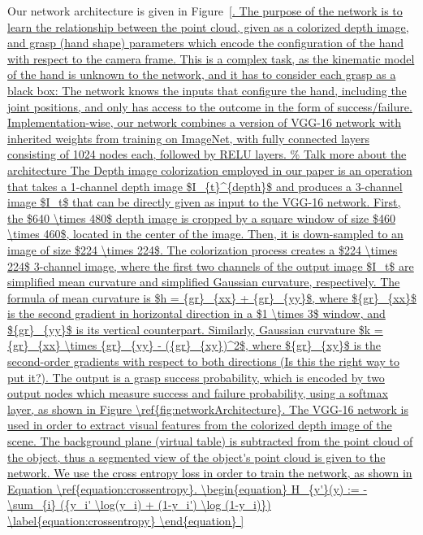 Our network architecture is given in Figure~\ref{. The purpose of the network is to learn the relationship between the point cloud, given as a colorized depth image, and grasp (hand shape) parameters which encode the configuration of the hand with respect to the camera frame. This is a complex task, as the kinematic model of the hand is unknown to the network, and it has to consider each grasp as a black box: The network knows the inputs that configure the hand, including the joint positions, and only has access to the outcome in the form of success/failure. Implementation-wise, our network combines a version of VGG-16 network with inherited weights from training on ImageNet, with fully connected layers consisting of 1024 nodes each, followed by RELU layers. 

The Depth image colorization employed in our paper is an operation that takes a 1-channel depth image $I_{t}^{depth}$ and produces a 3-channel image $I_t$ that can be directly given as input to the VGG-16 network. First, the $640 \times 480$ depth image is cropped by a square window of size $460 \times 460$, located in the center of the image. Then, it is down-sampled to an image of size $224 \times 224$. The colorization process creates a $224 \times 224$ 3-channel image, where the first two channels of the output image $I_t$ are simplified mean curvature and simplified Gaussian curvature, respectively. The formula of mean curvature is $h = {gr}_{xx} + {gr}_{yy}$, where ${gr}_{xx}$ is the second gradient in horizontal direction in a $1 \times 3$ window, and ${gr}_{yy}$ is its vertical counterpart. Similarly, Gaussian curvature $k = {gr}_{xx} \times {gr}_{yy} - ({gr}_{xy})^2$, where ${gr}_{xy}$ is the second-order gradients with respect to both directions (Is this the right way to put it?).

The output is a grasp success probability, which is encoded by two output nodes which measure success and failure probability, using a softmax layer, as shown in Figure \ref{fig:networkArchitecture}. The VGG-16 network is used in order to extract visual features from the colorized depth image of the scene. The background plane (virtual table) is subtracted from the point cloud of the object, thus a segmented view of the object's point cloud is given to the network. 

We use the cross entropy loss in order to train the network, as shown in Equation \ref{equation:crossentropy}.

\begin{equation}
H_{y'}(y) := - \sum_{i} ({y_i' \log(y_i) + (1-y_i') \log (1-y_i)})
\label{equation:crossentropy}
\end{equation}

}
